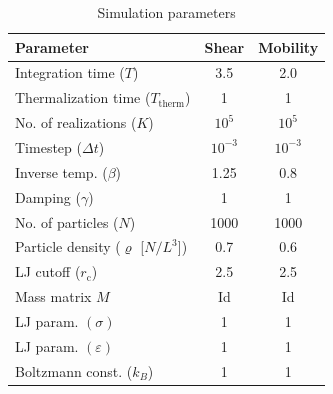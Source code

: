 \documentclass[11pt]{article}
\theoremstyle{definition}
\begin{document}
\begin{table}[h!]
\centering
\begin{tabular}{@{}lcc@{}}
	\toprule
	\bf{Parameter} & {\bf Shear} & {\bf Mobility} \\
	\midrule
Integration time ($T$) & 3.5 & 2.0 \\
    Thermalization time ($T_\mathrm{therm}$) & 1 & 1 \\
	No. of realizations ($K$) & $10^5$ & $10^5$ \\
	Timestep ($\Delta t$) & $10^{-3}$ & $10^{-3}$ \\
	Inverse temp. ($\beta$) & 1.25 & 0.8 \\
	Damping ($\gamma$) & 1 & 1 \\
	No. of particles ($N$) & 1000 & 1000 \\
	Particle density ($\varrho$ [$N/L^3$]) & 0.7 & 0.6 \\
	LJ cutoff ($r_\mathrm{c}$) & 2.5 & 2.5 \\
	Mass matrix $M$ & {\rm Id} & {\rm Id} \\
	LJ param. $(\sigma)$ & 1 & 1 \\
	LJ param. $(\varepsilon)$ & 1 & 1 \\
	Boltzmann const. ($k_B$) & 1 & 1 \\
	\bottomrule
\end{tabular}
\caption{Simulation parameters}\label{table:sim_params}%
\end{table}
\end{document}
